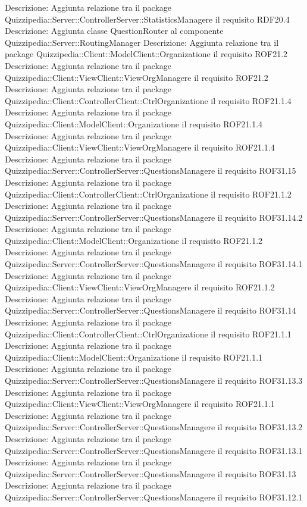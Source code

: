 Descrizione: Aggiunta relazione tra il package Quizzipedia::Server::ControllerServer::StatisticsManagere il requisito RDF20.4 
Descrizione: Aggiunta classe QuestionRouter al componente Quizzipedia::Server::RoutingManager 
Descrizione: Aggiunta relazione tra il package Quizzipedia::Client::ModelClient::Organizatione il requisito ROF21.2 
Descrizione: Aggiunta relazione tra il package Quizzipedia::Client::ViewClient::ViewOrgManagere il requisito ROF21.2 
Descrizione: Aggiunta relazione tra il package Quizzipedia::Client::ControllerClient::CtrlOrganizatione il requisito ROF21.1.4 
Descrizione: Aggiunta relazione tra il package Quizzipedia::Client::ModelClient::Organizatione il requisito ROF21.1.4 
Descrizione: Aggiunta relazione tra il package Quizzipedia::Client::ViewClient::ViewOrgManagere il requisito ROF21.1.4 
Descrizione: Aggiunta relazione tra il package Quizzipedia::Server::ControllerServer::QuestionsManagere il requisito ROF31.15 
Descrizione: Aggiunta relazione tra il package Quizzipedia::Client::ControllerClient::CtrlOrganizatione il requisito ROF21.1.2 
Descrizione: Aggiunta relazione tra il package Quizzipedia::Server::ControllerServer::QuestionsManagere il requisito ROF31.14.2 
Descrizione: Aggiunta relazione tra il package Quizzipedia::Client::ModelClient::Organizatione il requisito ROF21.1.2 
Descrizione: Aggiunta relazione tra il package Quizzipedia::Server::ControllerServer::QuestionsManagere il requisito ROF31.14.1 
Descrizione: Aggiunta relazione tra il package Quizzipedia::Client::ViewClient::ViewOrgManagere il requisito ROF21.1.2 
Descrizione: Aggiunta relazione tra il package Quizzipedia::Server::ControllerServer::QuestionsManagere il requisito ROF31.14 
Descrizione: Aggiunta relazione tra il package Quizzipedia::Client::ControllerClient::CtrlOrganizatione il requisito ROF21.1.1 
Descrizione: Aggiunta relazione tra il package Quizzipedia::Client::ModelClient::Organizatione il requisito ROF21.1.1 
Descrizione: Aggiunta relazione tra il package Quizzipedia::Server::ControllerServer::QuestionsManagere il requisito ROF31.13.3 
Descrizione: Aggiunta relazione tra il package Quizzipedia::Client::ViewClient::ViewOrgManagere il requisito ROF21.1.1 
Descrizione: Aggiunta relazione tra il package Quizzipedia::Server::ControllerServer::QuestionsManagere il requisito ROF31.13.2 
Descrizione: Aggiunta relazione tra il package Quizzipedia::Server::ControllerServer::QuestionsManagere il requisito ROF31.13.1 
Descrizione: Aggiunta relazione tra il package Quizzipedia::Server::ControllerServer::QuestionsManagere il requisito ROF31.13 
Descrizione: Aggiunta relazione tra il package Quizzipedia::Server::ControllerServer::QuestionsManagere il requisito ROF31.12.1 
